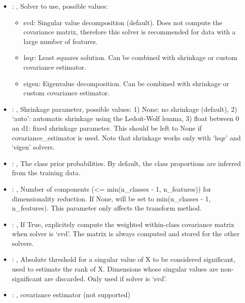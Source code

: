 \begin{itemize}
    \item {}: , 
      Solver to use, possible values:
      \begin{itemize}                                                    \item svd: Singular value
      decomposition (default). Does not compute the covariance matrix,
      therefore this solver is recommended for data with a large number of features.
      \item lsqr: Least squares solution. Can be combined with shrinkage or custom covariance
      estimator.                                                    \item eigen: Eigenvalue
      decomposition. Can be combined with shrinkage or custom covariance estimator.
      \end{itemize}

    \item {}: , 
      Shrinkage parameter, possible values: 1) None: no shrinkage (default),
      2) `auto': automatic shrinkage using the Ledoit-Wolf lemma,
      3) float between 0 an d1: fixed shrinkage parameter.
      This should be left to None if covariance\_estimator is used. Note that shrinkage works
      only with `lsqr' and `eigen' solvers.

    \item {}: , 
      The class prior probabilities. By default, the class proportions are inferred from the
      training data.

    \item {}: , 
      Number of components (<= min(n\_classes - 1, n\_features)) for dimensionality reduction.
      If None, will be set to min(n\_classes - 1, n\_features). This parameter only affects the
      transform                                                  method.

    \item {}: , 
      If True, explicitely compute the weighted within-class covariance matrix when solver
      is `svd'. The matrix is always computed and stored for the other solvers.

    \item {}: , 
      Absolute threshold for a singular value of X to be considered significant, used to estimate
      the rank of X.                                                  Dimensions whose singular
      values are non-significant are discarded. Only used if solver is `svd'.

    \item {}: , 
      covariance estimator (not supported)
  \end{itemize}



